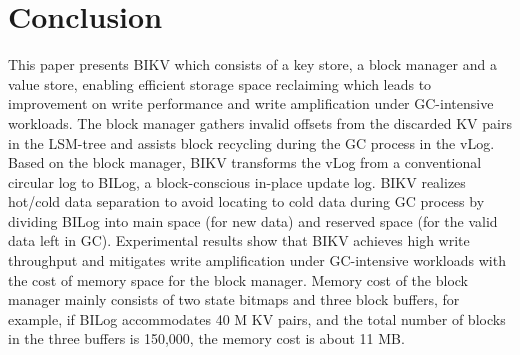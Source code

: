 \documentclass[sigconf]{acmart}
\begin{document}
\section{Conclusion}
This paper presents BIKV which consists of a key store, a block manager and a value store, enabling efficient storage space reclaiming which leads to improvement on write performance and write amplification under GC-intensive workloads. The block manager gathers invalid offsets from the discarded KV pairs in the LSM-tree and assists block recycling during the GC process in the vLog. Based on the block manager, BIKV transforms the vLog from a conventional circular log to BILog, a block-conscious in-place update log. BIKV realizes hot/cold data separation to avoid locating to cold data during GC process by dividing BILog into main space (for new data) and reserved space (for the valid data left in GC). Experimental results show that BIKV achieves high write throughput and mitigates write amplification under GC-intensive workloads with the cost of memory space for the block manager. Memory cost of the block manager mainly consists of two state bitmaps and three block buffers, for example, if BILog accommodates 40 M KV pairs, and the total number of blocks in the three buffers is 150,000, the memory cost is about 11 MB.

\end{document}
